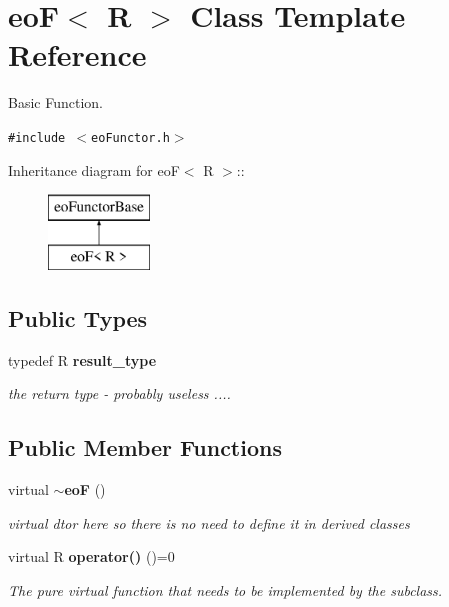 \section{eo\-F$<$ R $>$ Class Template Reference}
\label{classeo_f}
Basic Function.  


{\tt \#include $<$eo\-Functor.h$>$}

Inheritance diagram for eo\-F$<$ R $>$::\begin{figure}[H]
\begin{center}
\leavevmode
\includegraphics[height=2cm]{classeo_f}
\end{center}
\end{figure}
\subsection*{Public Types}
\begin{CompactItemize}
\item 
typedef R {\bf result\_\-type}\label{classeo_f_w0}

\begin{CompactList}\small\item\em the return type - probably useless .... \item\end{CompactList}\end{CompactItemize}
\subsection*{Public Member Functions}
\begin{CompactItemize}
\item 
virtual {\bf $\sim$eo\-F} ()\label{classeo_f_a0}

\begin{CompactList}\small\item\em virtual dtor here so there is no need to define it in derived classes \item\end{CompactList}\item 
virtual R {\bf operator()} ()=0\label{classeo_f_a1}

\begin{CompactList}\small\item\em The pure virtual function that needs to be implemented by the subclass. \item\end{CompactList}\end{CompactItemize}
